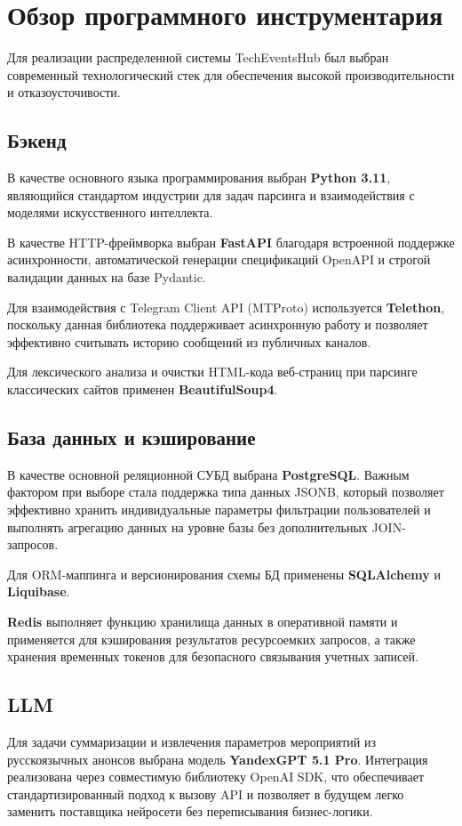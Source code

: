 \section{Обзор программного инструментария}

Для реализации распределенной системы TechEventsHub был выбран современный технологический стек для обеспечения высокой производительности и отказоусточивости.

\subsection*{Бэкенд}
В качестве основного языка программирования выбран \textbf{Python 3.11}, являющийся стандартом индустрии для задач парсинга и взаимодействия с моделями искусственного интеллекта.

В качестве HTTP-фреймворка выбран \textbf{FastAPI} благодаря встроенной поддержке асинхронности, автоматической генерации спецификаций OpenAPI и строгой валидации данных на базе Pydantic.

Для взаимодействия с Telegram Client API (MTProto) используется \textbf{Telethon}, поскольку данная библиотека поддерживает асинхронную работу и позволяет эффективно считывать историю сообщений из публичных каналов.

Для лексического анализа и очистки HTML-кода веб-страниц при парсинге классических сайтов применен \textbf{BeautifulSoup4}.

\subsection*{База данных и кэширование}
В качестве основной реляционной СУБД выбрана \textbf{PostgreSQL}. 
Важным фактором при выборе стала поддержка типа данных JSONB, который позволяет эффективно хранить индивидуальные параметры фильтрации пользователей и выполнять агрегацию данных на уровне базы без дополнительных JOIN-запросов.

Для ORM-маппинга и версионирования схемы БД применены \textbf{SQLAlchemy} и \textbf{Liquibase}.

\textbf{Redis} выполняет функцию хранилища данных в оперативной памяти и применяется для кэширования результатов ресурсоемких запросов, а также хранения временных токенов для безопасного связывания учетных записей.

\subsection*{LLM}
Для задачи суммаризации и извлечения параметров мероприятий из русскоязычных анонсов выбрана модель \textbf{YandexGPT 5.1 Pro}. 
Интеграция реализована через совместимую библиотеку OpenAI SDK, что обеспечивает стандартизированный подход к вызову API и позволяет в будущем легко заменить поставщика нейросети без переписывания бизнес-логики.


